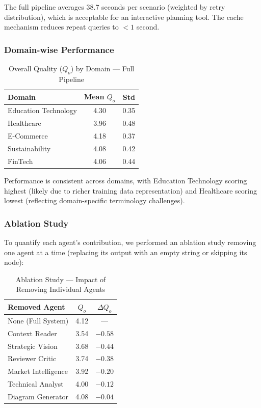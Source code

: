 \documentclass[journal]{IEEEtran}
\begin{document}
The full pipeline averages 38.7 seconds per scenario (weighted by retry distribution), which is acceptable for an interactive planning tool. The cache mechanism reduces repeat queries to $<1$ second.

\subsubsection{Domain-wise Performance}

\begin{table}[!t]
    \centering
    \caption{Overall Quality ($Q_o$) by Domain --- Full Pipeline}
    \label{tab:domain}
    \begin{tabular}{@{}lcc@{}}
        \toprule
        \textbf{Domain} & \textbf{Mean $Q_o$} & \textbf{Std} \\
        \midrule
        Education Technology & 4.30 & 0.35 \\
        Healthcare & 3.96 & 0.48 \\
        E-Commerce & 4.18 & 0.37 \\
        Sustainability & 4.08 & 0.42 \\
        FinTech & 4.06 & 0.44 \\
        \bottomrule
    \end{tabular}
\end{table}

Performance is consistent across domains, with Education Technology scoring highest (likely due to richer training data representation) and Healthcare scoring lowest (reflecting domain-specific terminology challenges).

\subsubsection{Ablation Study}

To quantify each agent's contribution, we performed an ablation study removing one agent at a time (replacing its output with an empty string or skipping its node):

\begin{table}[!t]
    \centering
    \caption{Ablation Study --- Impact of Removing Individual Agents}
    \label{tab:ablation}
    \begin{tabular}{@{}lcc@{}}
        \toprule
        \textbf{Removed Agent} & \textbf{$Q_o$} & \textbf{$\Delta Q_o$} \\
        \midrule
        None (Full System) & 4.12 & --- \\
        Context Reader & 3.54 & $-0.58$ \\
        Strategic Vision & 3.68 & $-0.44$ \\
        Reviewer Critic & 3.74 & $-0.38$ \\
        Market Intelligence & 3.92 & $-0.20$ \\
        Technical Analyst & 4.00 & $-0.12$ \\
        Diagram Generator & 4.08 & $-0.04$ \\
        \bottomrule
    \end{tabular}
\end{table}
\end{document}

